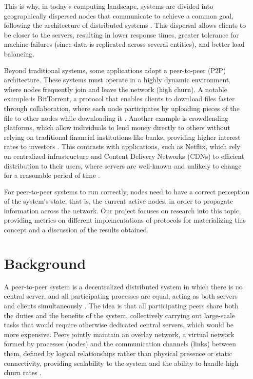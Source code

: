 \documentclass[sigconf,a4paper]{acmart}
\begin{document}
This is why, in today's computing landscape, systems are divided into geographically dispersed 
nodes that communicate to achieve a common goal, following the architecture of distributed systems \cite{distributed_systems_principles_and_paradigms_2nd_edition}. 
This dispersal allows clients to be closer to the servers, resulting in lower response times, greater 
tolerance for machine failures (since data is replicated across several entities), and better load balancing.

Beyond traditional systems, some applications adopt a peer-to-peer (P2P) architecture. 
These systems must operate in a highly dynamic environment, where nodes frequently join 
and leave the network (high churn). A notable example is BitTorrent, a protocol that enables 
clients to download files faster through collaboration, where each node participates by uploading pieces 
of the file to other nodes while downloading it \cite{incentives-build-robustness-in-bittorrent}. Another example is crowdlending platforms, which allow 
individuals to lend money directly to others without relying on traditional financial institutions like banks, 
providing higher interest rates to investors \cite{P2P-lending-opportunities-and-risks}. This contrasts with applications, such as Netflix, which rely on 
centralized infrastructure and Content Delivery Networks (CDNs) to efficient distribution to their users, where 
servers are well-known and unlikely to change for a reasonable period of time \cite{measurement-study-of-netflix}.

For peer-to-peer systems to run correctly, nodes need to have a correct perception of 
the system's state, that is, the current active nodes, in order to propagate information 
across the network. Our project focuses on research into this topic, providing metrics 
on different implementations of protocols for materializing this concept and a discussion of the results obtained.


\section{Background}
A peer-to-peer system is a decentralized distributed system in which there is no central server, 
and all participating processes are equal, acting as both servers and clients simultaneously \cite{introduction-to-reliable-and-secure-distributed-programming}. 
The idea is that all participating peers share both the duties and the benefits of the system, 
collectively carrying out large-scale tasks that would require otherwise dedicated central servers, 
which would be more expensive. Peers jointly maintain an overlay network, a virtual network formed by 
processes (nodes) and the communication channels (links) between them, defined by logical relationships 
rather than physical presence or static connectivity, providing scalability to the system and the ability 
to handle high churn rates \cite{distributed_systems_principles_and_paradigms_2nd_edition,cyclon}.
\end{document}
